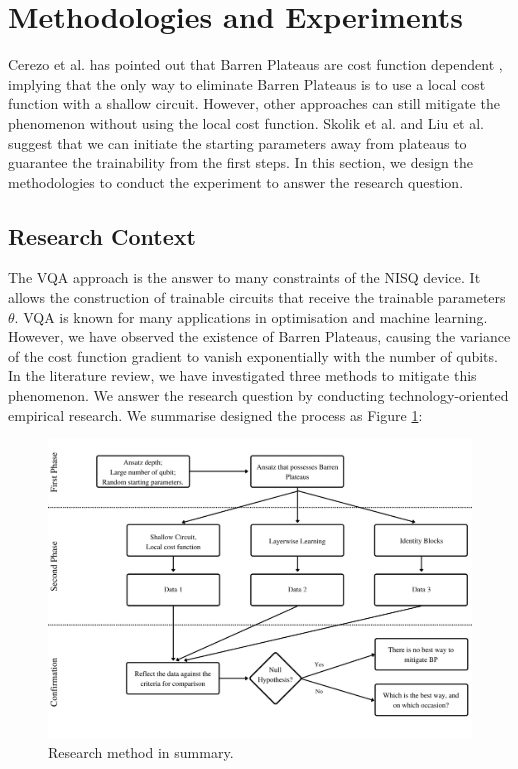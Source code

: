 \section{Methodologies and Experiments}
Cerezo et al. has pointed out that Barren Plateaus are cost function dependent \cite{cerezoCostFunctionDependent2021}, implying that the only way to eliminate Barren Plateaus is to use a local cost function with a shallow circuit.
However, other approaches can still mitigate the phenomenon without using the local cost function.
Skolik et al. and Liu et al. \cite{skolikLayerwiseLearningQuantum2021, liuParameterInitializationMethod2021} suggest that we can initiate the starting parameters away from plateaus to guarantee the trainability from the first steps.
In this section, we design the methodologies to conduct the experiment to answer the research question.

\subsection{Research Context}
The VQA approach is the answer to many constraints of the NISQ device. It allows the construction of trainable circuits that receive the trainable parameters $\theta$. VQA is known for many applications in optimisation and machine learning. However, we have observed the existence of Barren Plateaus, causing the variance of the cost function gradient to vanish exponentially with the number of qubits.
In the literature review, we have investigated three methods \cite{cerezoCostFunctionDependent2021, liuParameterInitializationMethod2021, skolikLayerwiseLearningQuantum2021} to mitigate this phenomenon.
We answer the research question by conducting technology-oriented empirical research. 
We summarise designed the process as Figure \ref{Research Activities}:

\begin{figure}
    \centering
    \includegraphics[width=\textwidth]{./ResearchDesign/Appendices/Method.png}
    \caption{
        Research method in summary.
    }
    \label{Research Activities}
\end{figure}

